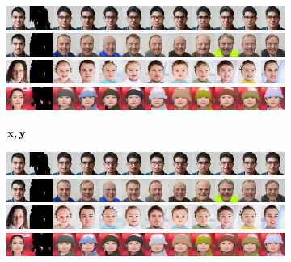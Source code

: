 \begin{figure}[t]
  \centering
  \begin{subfigure}[t]{0.14\textwidth}
    \centering
    \includegraphics[trim=0px 0px 2560px 0px, clip, height=\cmgfailureimgheight]{figs/cigcvae/co_mod_gan_failure/co_mod_gan_0_3_2.jpg}
    \includegraphics[trim=0px 0px 2560px 0px, clip, height=\cmgfailureimgheight]{figs/cigcvae/co_mod_gan_failure/co_mod_gan_0_4_2.jpg}
    \includegraphics[trim=0px 0px 2560px 0px, clip, height=\cmgfailureimgheight]{figs/cigcvae/co_mod_gan_failure/co_mod_gan_1_4_2.jpg}
    \includegraphics[trim=0px 0px 2560px 0px, clip, height=\cmgfailureimgheight]{figs/cigcvae/co_mod_gan_failure/co_mod_gan_56_4_12.jpg}
    \caption{\scriptsize ${\mathbf{x}}, {\mathbf{y}}$}
  \end{subfigure}
  \begin{subfigure}[t]{0.73\textwidth}
    \centering
    \includegraphics[trim=512px 0px 0px 0px, clip, height=\cmgfailureimgheight]{figs/cigcvae/co_mod_gan_failure/co_mod_gan_0_3_2.jpg}
    \includegraphics[trim=512px 0px 0px 0px, clip, height=\cmgfailureimgheight]{figs/cigcvae/co_mod_gan_failure/co_mod_gan_0_4_2.jpg}
    \includegraphics[trim=512px 0px 0px 0px, clip, height=\cmgfailureimgheight]{figs/cigcvae/co_mod_gan_failure/co_mod_gan_1_4_2.jpg}
    \includegraphics[trim=512px 0px 0px 0px, clip, height=\cmgfailureimgheight]{figs/cigcvae/co_mod_gan_failure/co_mod_gan_56_4_12.jpg}

\end{subfigure}
\end{figure}
